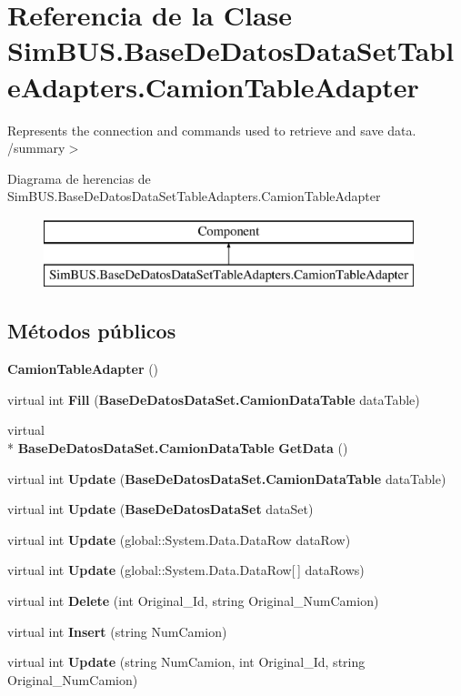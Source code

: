 \section{Referencia de la Clase Sim\-B\-U\-S.\-Base\-De\-Datos\-Data\-Set\-Table\-Adapters.\-Camion\-Table\-Adapter}
\label{class_sim_b_u_s_1_1_base_de_datos_data_set_table_adapters_1_1_camion_table_adapter}


Represents the connection and commands used to retrieve and save data. /summary$>$  


Diagrama de herencias de Sim\-B\-U\-S.\-Base\-De\-Datos\-Data\-Set\-Table\-Adapters.\-Camion\-Table\-Adapter\begin{figure}[H]
\begin{center}
\leavevmode
\includegraphics[height=2.000000cm]{class_sim_b_u_s_1_1_base_de_datos_data_set_table_adapters_1_1_camion_table_adapter}
\end{center}
\end{figure}
\subsection*{Métodos públicos}
\begin{DoxyCompactItemize}
\item 
{\bf Camion\-Table\-Adapter} ()
\item 
virtual int {\bf Fill} ({\bf Base\-De\-Datos\-Data\-Set.\-Camion\-Data\-Table} data\-Table)
\item 
virtual \\*
{\bf Base\-De\-Datos\-Data\-Set.\-Camion\-Data\-Table} {\bf Get\-Data} ()
\item 
virtual int {\bf Update} ({\bf Base\-De\-Datos\-Data\-Set.\-Camion\-Data\-Table} data\-Table)
\item 
virtual int {\bf Update} ({\bf Base\-De\-Datos\-Data\-Set} data\-Set)
\item 
virtual int {\bf Update} (global\-::\-System.\-Data.\-Data\-Row data\-Row)
\item 
virtual int {\bf Update} (global\-::\-System.\-Data.\-Data\-Row[$\,$] data\-Rows)
\item 
virtual int {\bf Delete} (int Original\-\_\-\-Id, string Original\-\_\-\-Num\-Camion)
\item 
virtual int {\bf Insert} (string Num\-Camion)
\item 
virtual int {\bf Update} (string Num\-Camion, int Original\-\_\-\-Id, string Original\-\_\-\-Num\-Camion)
\end{DoxyCompactItemize}
